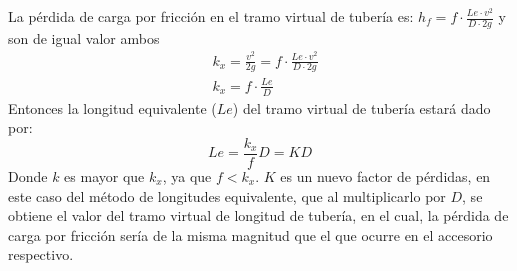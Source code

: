 La pérdida de carga por fricción en el tramo virtual de tubería es: $h_f= f\cdot \frac{Le\cdot v^2}{D\cdot 2g}$
y son de igual valor ambos
\begin{align*}
    &k_x = \frac{v^2}{2g} = f\cdot \frac{Le\cdot v^2}{D\cdot 2g}\\
    &k_x = f\cdot \frac{Le}{D}
\end{align*}
Entonces la longitud equivalente ($Le$) del tramo virtual de tubería estará dado por:
\begin{equation}
    Le = \frac{k_x}{f}D = KD
\end{equation}
Donde $k$ es mayor que $k_x$, ya que $f< k_x$. $K$ es un nuevo factor de pérdidas, en este caso del método de longitudes equivalente, que al multiplicarlo por $D$, se obtiene el valor del tramo virtual de longitud de tubería, en el cual, la pérdida de carga por fricción sería de la misma magnitud que el que ocurre en el accesorio respectivo.
